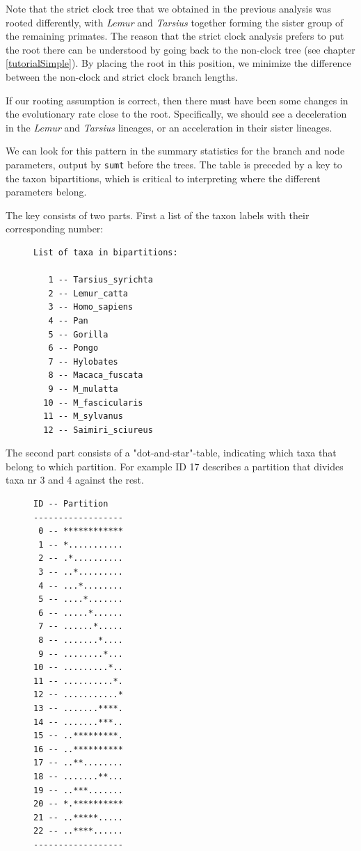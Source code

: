 \documentclass[12pt]{book}
\begin{document}
Note that the strict clock tree that we obtained in the previous analysis was rooted differently,
with \textit{Lemur} and \textit{Tarsius} together forming the sister group of the remaining
primates. The reason that the strict clock analysis prefers to put the root there can be
understood by going back to the non-clock tree (see chapter \ref{tutorialSimple}). By placing
the root in this position, we minimize the difference between the non-clock and strict clock
branch lengths.

If our rooting assumption is correct, then there must have been some changes in the evolutionary
rate close to the root. Specifically, we should see a deceleration in the \textit{Lemur} and
\textit{Tarsius} lineages, or an acceleration in their sister lineages.

We can look for this pattern in the summary statistics for the branch and node parameters, output
by \texttt{sumt} before the trees. The table is preceded by a key to the taxon bipartitions,
which is critical to interpreting where the different parameters belong.

The key consists of two parts. First a list of the taxon labels with their corresponding number:

\begin{figure}[h]
\centering
\begin{BVerbatim}
List of taxa in bipartitions:                                                 
                                                                                
   1 -- Tarsius_syrichta
   2 -- Lemur_catta
   3 -- Homo_sapiens
   4 -- Pan
   5 -- Gorilla
   6 -- Pongo
   7 -- Hylobates
   8 -- Macaca_fuscata
   9 -- M_mulatta
  10 -- M_fascicularis
  11 -- M_sylvanus
  12 -- Saimiri_sciureus
\end{BVerbatim}
\end{figure}

The second part consists of a "dot-and-star"-table, indicating which taxa that belong to which
partition. For example ID 17 describes a partition that divides taxa nr 3 and 4 against the rest.
\begin{figure}[H]
\centering
\begin{BVerbatim}
ID -- Partition
------------------
 0 -- ************
 1 -- *...........
 2 -- .*..........
 3 -- ..*.........
 4 -- ...*........
 5 -- ....*.......
 6 -- .....*......
 7 -- ......*.....
 8 -- .......*....
 9 -- ........*...
10 -- .........*..
11 -- ..........*.
12 -- ...........*
13 -- .......****.
14 -- .......***..
15 -- ..*********.
16 -- ..**********
17 -- ..**........
18 -- .......**...
19 -- ..***.......
20 -- *.**********
21 -- ..*****.....
22 -- ..****......
------------------
\end{BVerbatim}
\end{figure}
\end{document}
